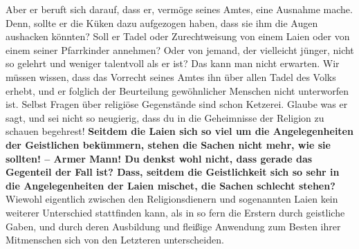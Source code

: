 Aber er beruft sich darauf, dass er, vermöge seines Amtes, eine
Ausnahme mache.
Denn, sollte er die Küken dazu aufgezogen haben, dass sie ihm die Augen
aushacken könnten? Soll er Tadel oder Zurechtweisung von einem
Laien oder von
einem seiner Pfarrkinder annehmen? Oder von jemand, der vielleicht jünger, nicht
so gelehrt und weniger talentvoll als er ist? Das kann man nicht erwarten. Wir
müssen wissen, dass das Vorrecht seines Amtes ihn über allen Tadel des Volks
erhebt, und er folglich der Beurteilung gewöhnlicher Menschen nicht unterworfen
ist. Selbst Fragen über religiöse Gegenstände sind schon
Ketzerei. Glaube was er
sagt, und sei nicht so neugierig, dass du in die Geheimnisse der
Religion zu
schauen begehrest! \textbf{Seitdem die Laien sich so viel um die Angelegenheiten
der
Geistlichen bekümmern, stehen die Sachen nicht mehr, wie sie sollten! -- Armer
Mann! Du denkst wohl nicht, dass gerade das Gegenteil der Fall ist? Dass, seitdem
die Geistlichkeit sich so sehr in die Angelegenheiten der Laien mischet, die
Sachen schlecht stehen?} Wiewohl eigentlich zwischen den Religionsdienern und
sogenannten Laien kein weiterer Unterschied stattfinden kann, als in so fern
die Erstern durch geistliche Gaben, und durch deren Ausbildung und fleißige
Anwendung zum Besten ihrer Mitmenschen sich von den Letzteren unterscheiden.

